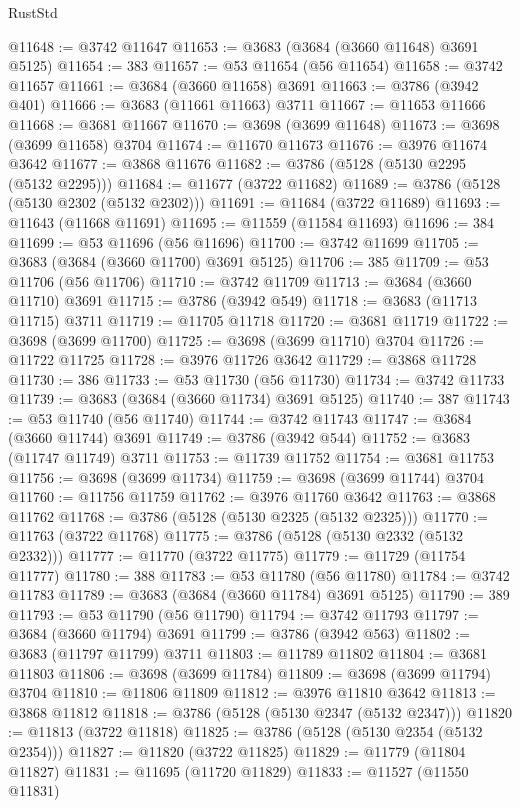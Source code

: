\begin{lexlean}{RustStd}
\begin{coremodule}
@11648 := @3742 @11647
@11653 := @3683 (@3684 (@3660 @11648) @3691 @5125)
@11654 := 383
@11657 := @53 @11654 (@56 @11654)
@11658 := @3742 @11657
@11661 := @3684 (@3660 @11658) @3691
@11663 := @3786 (@3942 @401)
@11666 := @3683 (@11661 @11663) @3711
@11667 := @11653 @11666
@11668 := @3681 @11667
@11670 := @3698 (@3699 @11648)
@11673 := @3698 (@3699 @11658) @3704
@11674 := @11670 @11673
@11676 := @3976 @11674 @3642
@11677 := @3868 @11676
@11682 := @3786 (@5128 (@5130 @2295 (@5132 @2295)))
@11684 := @11677 (@3722 @11682)
@11689 := @3786 (@5128 (@5130 @2302 (@5132 @2302)))
@11691 := @11684 (@3722 @11689)
@11693 := @11643 (@11668 @11691)
@11695 := @11559 (@11584 @11693)
@11696 := 384
@11699 := @53 @11696 (@56 @11696)
@11700 := @3742 @11699
@11705 := @3683 (@3684 (@3660 @11700) @3691 @5125)
@11706 := 385
@11709 := @53 @11706 (@56 @11706)
@11710 := @3742 @11709
@11713 := @3684 (@3660 @11710) @3691
@11715 := @3786 (@3942 @549)
@11718 := @3683 (@11713 @11715) @3711
@11719 := @11705 @11718
@11720 := @3681 @11719
@11722 := @3698 (@3699 @11700)
@11725 := @3698 (@3699 @11710) @3704
@11726 := @11722 @11725
@11728 := @3976 @11726 @3642
@11729 := @3868 @11728
@11730 := 386
@11733 := @53 @11730 (@56 @11730)
@11734 := @3742 @11733
@11739 := @3683 (@3684 (@3660 @11734) @3691 @5125)
@11740 := 387
@11743 := @53 @11740 (@56 @11740)
@11744 := @3742 @11743
@11747 := @3684 (@3660 @11744) @3691
@11749 := @3786 (@3942 @544)
@11752 := @3683 (@11747 @11749) @3711
@11753 := @11739 @11752
@11754 := @3681 @11753
@11756 := @3698 (@3699 @11734)
@11759 := @3698 (@3699 @11744) @3704
@11760 := @11756 @11759
@11762 := @3976 @11760 @3642
@11763 := @3868 @11762
@11768 := @3786 (@5128 (@5130 @2325 (@5132 @2325)))
@11770 := @11763 (@3722 @11768)
@11775 := @3786 (@5128 (@5130 @2332 (@5132 @2332)))
@11777 := @11770 (@3722 @11775)
@11779 := @11729 (@11754 @11777)
@11780 := 388
@11783 := @53 @11780 (@56 @11780)
@11784 := @3742 @11783
@11789 := @3683 (@3684 (@3660 @11784) @3691 @5125)
@11790 := 389
@11793 := @53 @11790 (@56 @11790)
@11794 := @3742 @11793
@11797 := @3684 (@3660 @11794) @3691
@11799 := @3786 (@3942 @563)
@11802 := @3683 (@11797 @11799) @3711
@11803 := @11789 @11802
@11804 := @3681 @11803
@11806 := @3698 (@3699 @11784)
@11809 := @3698 (@3699 @11794) @3704
@11810 := @11806 @11809
@11812 := @3976 @11810 @3642
@11813 := @3868 @11812
@11818 := @3786 (@5128 (@5130 @2347 (@5132 @2347)))
@11820 := @11813 (@3722 @11818)
@11825 := @3786 (@5128 (@5130 @2354 (@5132 @2354)))
@11827 := @11820 (@3722 @11825)
@11829 := @11779 (@11804 @11827)
@11831 := @11695 (@11720 @11829)
@11833 := @11527 (@11550 @11831)

\end{coremodule}
\end{lexlean}
